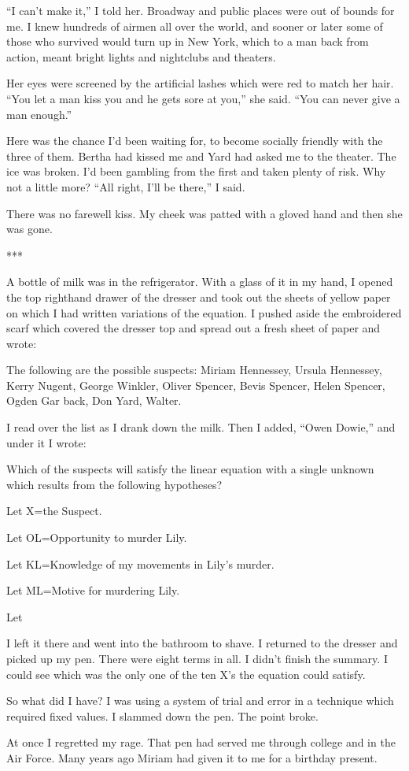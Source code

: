 {“I can’t make it,” I told her. Broadway and public places were out of bounds for me. I knew hundreds of airmen all over the world, and sooner or later some of those who survived would turn up in New York, which to a man back from action, meant bright lights and nightclubs and theaters.

Her eyes were screened by the artificial lashes which were red to match her hair. “You let a man kiss you and he gets sore at you,” she said. “You can never give a man enough.”

Here was the chance I’d been waiting for, to become socially friendly with the three of them. Bertha had kissed me and Yard had asked me to the theater. The ice was broken. I’d been gambling from the first and taken plenty of risk. Why not a little more? “All right, I’ll be there,” I said.

There was no farewell kiss. My cheek was patted with a gloved hand and then she was gone.

***

A bottle of milk was in the refrigerator. With a glass of it in my hand, I opened the top righthand drawer of the dresser and took out the sheets of yellow paper on which I had written variations of the equation. I pushed aside the embroidered scarf which covered the dresser top and spread out a fresh sheet of paper and wrote:

The following are the possible suspects: Miriam Hennessey, Ursula Hennessey, Kerry Nugent, George Winkler, Oliver Spencer, Bevis Spencer, Helen Spencer, Ogden Gar back, Don Yard, Walter.

I read over the list as I drank down the milk. Then I added, “Owen Dowie,” and under it I wrote:

Which of the suspects will satisfy the linear equation with a single unknown which results from the following hypotheses?

Let X=the Suspect.

Let OL=Opportunity to murder Lily.

Let KL=Knowledge of my movements in Lily’s murder.

Let ML=Motive for murdering Lily.

Let

I left it there and went into the bathroom to shave. I returned to the dresser and picked up my pen. There were eight terms in all. I didn’t finish the summary. I could see which was the only one of the ten X’s the equation could satisfy.

So what did I have? I was using a system of trial and error in a technique which required fixed values. I slammed down the pen. The point broke.

At once I regretted my rage. That pen had served me through college and in the Air Force. Many years ago Miriam had given it to me for a birthday present.

}

